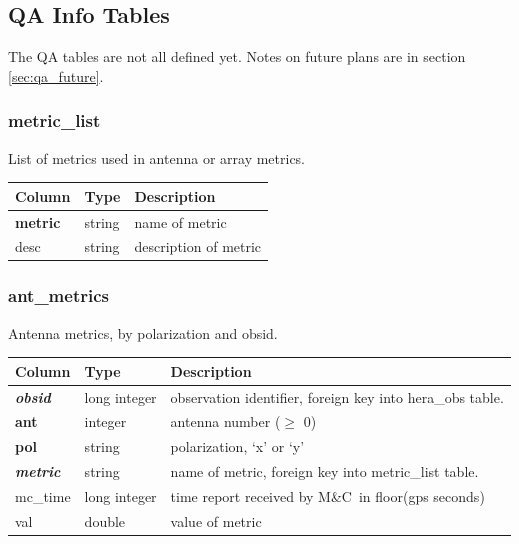 \documentclass{article}
\newcommand{\mc}{M\&C}
\begin{document}

\subsection{QA Info Tables}
The QA tables are not all defined yet. Notes on future plans are in section \ref{sec:qa_future}.

\subsubsection{metric\_list}
List of metrics used in antenna or array metrics.

\begin{center}
 \begin{tabular}{| p{4cm} | p{2cm} | p{10cm} |}
\hline
 {\bf Column} & {\bf Type}  & {\bf Description} \\ [0.5ex]  \hline\hline
\textbf{metric} & string & name of metric \\ \hline
desc & string & description of metric \\ \hline
\end{tabular}
\end{center}

\subsubsection{ant\_metrics}
Antenna metrics, by polarization and obsid.

\begin{center}
 \begin{tabular}{| p{4cm} | p{2cm} | p{10cm} |}
\hline
 {\bf Column} & {\bf Type}  & {\bf Description} \\ [0.5ex]  \hline\hline
\textbf{\textit{obsid}} & long integer & observation identifier, foreign key into hera\_obs table. \\ \hline
\textbf{ant} & integer & antenna number ($\geq$ 0) \\ \hline
\textbf{pol} & string & polarization, `x' or `y' \\ \hline
\textbf{\textit{metric}} & string & name of metric, foreign key into metric\_list table. \\ \hline
mc\_time & long integer & time report received by \mc\ in floor(gps seconds) \\ \hline
val & double & value of metric \\ \hline
\end{tabular}
\end{center}
\end{document}
